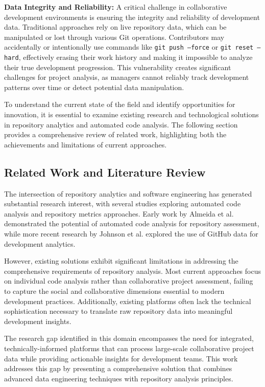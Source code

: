 \documentclass[12pt,a4paper]{article}
\begin{document}
\textbf{Data Integrity and Reliability:} A critical challenge in collaborative development environments is ensuring the integrity and reliability of development data. Traditional approaches rely on live repository data, which can be manipulated or lost through various Git operations. Contributors may accidentally or intentionally use commands like \texttt{git push --force} or \texttt{git reset --hard}, effectively erasing their work history and making it impossible to analyze their true development progression. This vulnerability creates significant challenges for project analysis, as managers cannot reliably track development patterns over time or detect potential data manipulation.

To understand the current state of the field and identify opportunities for innovation, it is essential to examine existing research and technological solutions in repository analytics and automated code analysis. The following section provides a comprehensive review of related work, highlighting both the achievements and limitations of current approaches.

\subsection{Related Work and Literature Review}

The intersection of repository analytics and software engineering has generated substantial research interest, with several studies exploring automated code analysis and repository metrics approaches. Early work by Almeida et al. \cite{almeida2018automated} demonstrated the potential of automated code analysis for repository assessment, while more recent research by Johnson et al. \cite{johnson2020github} explored the use of GitHub data for development analytics.

However, existing solutions exhibit significant limitations in addressing the comprehensive requirements of repository analysis. Most current approaches focus on individual code analysis rather than collaborative project assessment, failing to capture the social and collaborative dimensions essential to modern development practices. Additionally, existing platforms often lack the technical sophistication necessary to translate raw repository data into meaningful development insights.

The research gap identified in this domain encompasses the need for integrated, technically-informed platforms that can process large-scale collaborative project data while providing actionable insights for development teams. This work addresses this gap by presenting a comprehensive solution that combines advanced data engineering techniques with repository analysis principles.
\end{document}
